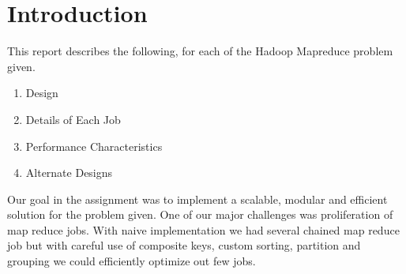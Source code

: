 \chapter{Introduction}
	This report describes the following, for each of the Hadoop Mapreduce problem given.
	
	\begin{enumerate}
	\item Design
	\item Details of Each Job
	\item Performance Characteristics
	\item Alternate Designs
	\end{enumerate}

	Our goal in the assignment was to implement a scalable, modular and efficient solution for the problem given. One of our major challenges was proliferation of map reduce jobs. With naive implementation we had several chained map reduce job but with careful use of composite keys, custom sorting, partition and grouping we could efficiently optimize out few jobs. 
	